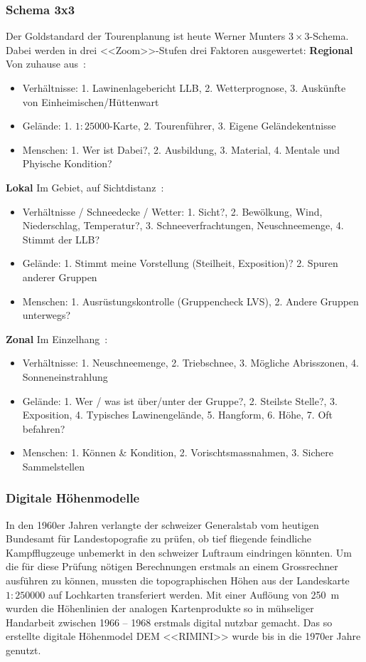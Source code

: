 \subsubsection{Schema 3x3}
Der Goldstandard der Tourenplanung ist heute Werner Munters $3\times3$-Schema. Dabei werden in drei <<Zoom>>-Stufen drei Faktoren ausgewertet:
\vfill
\textbf{Regional} 
Von zuhause aus~\cite{munter}:
\begin{itemize}
  \item Verhältnisse: 1. Lawinenlagebericht LLB, 2. Wetterprognose, 3. Auskünfte von Einheimischen/Hüttenwart
  \item Gelände: 1. $1:25000$-Karte, 2. Tourenführer, 3. Eigene Geländekentnisse
  \item Menschen: 1. Wer ist Dabei?, 2. Ausbildung, 3. Material, 4. Mentale und Phyische Kondition? 
\end{itemize}

\textbf{Lokal} Im Gebiet, auf Sichtdistanz~\cite{munter}\cite{redbull3x3}:
\begin{itemize}
  \item Verhältnisse / Schneedecke / Wetter: 1. Sicht?, 2. Bewölkung, Wind, Niederschlag, Temperatur?, 3. Schneeverfrachtungen, Neuschneemenge, 4. Stimmt der LLB?
  \item Gelände: 1. Stimmt meine Vorstellung (Steilheit, Exposition)? 2. Spuren anderer Gruppen
  \item Menschen: 1. Ausrüstungskontrolle (Gruppencheck LVS), 2. Andere Gruppen unterwegs?
\end{itemize}
\textbf{Zonal} Im Einzelhang~\cite{munter}\cite{redbull3x3}:
\begin{itemize}
  \item Verhältnisse: 1. Neuschneemenge, 2. Triebschnee, 3. Mögliche Abrisszonen, 4. Sonneneinstrahlung
  \item Gelände: 1. Wer / was ist über/unter der Gruppe?, 2. Steilste Stelle?, 3. Exposition, 4. Typisches Lawinengelände, 5. Hangform, 6. Höhe, 7. Oft befahren?
  \item Menschen: 1. Können \& Kondition, 2. Vorischtsmassnahmen, 3. Sichere Sammelstellen
\end{itemize}

\subsubsection{Digitale Höhenmodelle}

In den 1960er Jahren verlangte der schweizer Generalstab vom heutigen Bundesamt für Landestopografie zu prüfen, ob tief fliegende feindliche Kampfflugzeuge unbemerkt in den schweizer Luftraum eindringen könnten. Um die für diese Prüfung nötigen Berechnungen erstmals an einem Grossrechner ausführen zu können, mussten die topographischen Höhen aus der Landeskarte $1:250000$ auf Lochkarten transferiert werden. Mit einer Auflöung von \qty{250}{m} wurden die Höhenlinien der analogen Kartenprodukte so in mühseliger Handarbeit zwischen 1966 -- 1968 erstmals digital nutzbar gemacht. Das so erstellte digitale Höhenmodel DEM <<RIMINI>> wurde bis in die 1970er Jahre genutzt.~\cite{swisstopohistdem}

